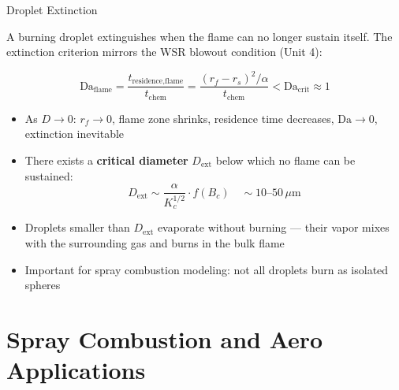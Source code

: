 \documentclass[12pt,aspectratio=169]{beamer}
\newcommand{\Da}{\mathrm{Da}}
\newcommand{\rf}{r_f}
\newcommand{\Bc}{B_c}
\newcommand{\tchem}{t_{\text{chem}}}
\newcommand{\Kc}{K_c}
\begin{document}
\begin{frame}{Droplet Extinction}

  A burning droplet extinguishes when the flame can no longer
  sustain itself.  The extinction criterion mirrors the WSR
  blowout condition (Unit 4):

  \[
    \Da_{\text{flame}} = \frac{t_{\text{residence,flame}}}{\tchem}
    = \frac{(r_f - r_s)^2 / \alpha}{\tchem} < \Da_{\text{crit}} \approx 1
  \]

  \begin{itemize}
    \item As $D \to 0$: $\rf \to 0$, flame zone shrinks, residence
          time decreases, $\Da \to 0$, extinction inevitable
    \item There exists a \textbf{critical diameter} $D_{\text{ext}}$
          below which no flame can be sustained:
          \[
            D_{\text{ext}} \sim \frac{\alpha}{\Kc^{1/2}} \cdot f(\Bc)
            \quad\sim 10\text{--}50\,\mu\text{m}
          \]
    \item Droplets smaller than $D_{\text{ext}}$ evaporate without
          burning --- their vapor mixes with the surrounding gas
          and burns in the bulk flame
    \item Important for spray combustion modeling: not all
          droplets burn as isolated spheres
  \end{itemize}
\end{frame}

\section{Spray Combustion and Aero Applications}
\end{document}
